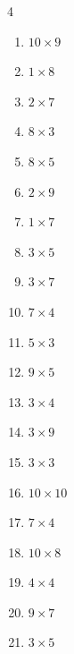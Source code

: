 \begin{multicols}{4}
\begin{enumerate}
  \item $10\times 9$
        \phantom{$=90$}

  \item $1\times 8$
        \phantom{$=8$}

  \item $2\times 7$
        \phantom{$=14$}

  \item $8\times 3$
        \phantom{$=24$}

  \item $8\times 5$
        \phantom{$=40$}

  \item $2\times 9$
        \phantom{$=18$}

  \item $1\times 7$
        \phantom{$=7$}

  \item $3\times 5$
        \phantom{$=15$}

  \item $3\times 7$
        \phantom{$=21$}

  \item $7\times 4$
        \phantom{$=28$}

  \item $5\times 3$
        \phantom{$=15$}

  \item $9\times 5$
        \phantom{$=45$}

  \item $3\times 4$
        \phantom{$=12$}

  \item $3\times 9$
        \phantom{$=27$}

  \item $3\times 3$
        \phantom{$=9$}

  \item $10\times 10$
        \phantom{$=100$}

  \item $7\times 4$
        \phantom{$=28$}

  \item $10\times 8$
        \phantom{$=80$}

  \item $4\times 4$
        \phantom{$=16$}

  \item $9\times 7$
        \phantom{$=63$}

  \item $3\times 5$
        \phantom{$=15$}


\end{enumerate}
\end{multicols}
